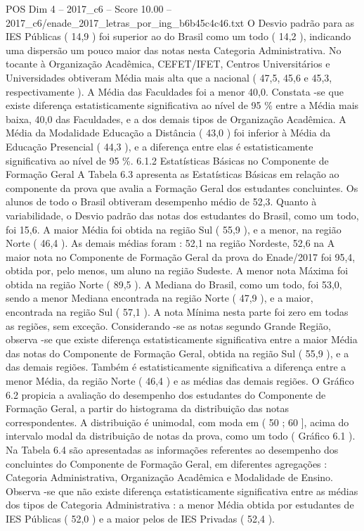 \begin{textsample}{POS Dim 4 – 2017\_c6 – Score 10.00 – 2017\_c6/enade\_2017\_letras\_por\_ing\_b6b45c4c46.txt}
O Desvio padrão para as IES Públicas ( 14,9 ) foi superior ao do Brasil como um todo ( 14,2 ), indicando uma dispersão um pouco maior das notas nesta Categoria Administrativa.
No tocante à Organização Acadêmica, CEFET/IFET, Centros Universitários e Universidades obtiveram Média mais alta que a nacional ( 47,5, 45,6 e 45,3, respectivamente ).
A Média das Faculdades foi a menor 40,0.
Constata -se que existe diferença estatisticamente significativa ao nível de 95 \% entre a Média mais baixa, 40,0 das Faculdades, e a dos demais tipos de Organização Acadêmica.
A Média da Modalidade Educação a Distância ( 43,0 ) foi inferior à Média da Educação Presencial ( 44,3 ), e a diferença entre elas é estatisticamente significativa ao nível de 95 \%. 6.1.2 Estatísticas Básicas no Componente de Formação Geral A Tabela 6.3 apresenta as Estatísticas Básicas em relação ao componente da prova que avalia a Formação Geral dos estudantes concluintes.
Os alunos de todo o Brasil obtiveram desempenho médio de 52,3.
Quanto à variabilidade, o Desvio padrão das notas dos estudantes do Brasil, como um todo, foi 15,6.
A maior Média foi obtida na região Sul ( 55,9 ), e a menor, na região Norte ( 46,4 ).
As demais médias foram : 52,1 na região Nordeste, 52,6 na A maior nota no Componente de Formação Geral da prova do Enade/2017 foi 95,4, obtida por, pelo menos, um aluno na região Sudeste.
A menor nota Máxima foi obtida na região Norte ( 89,5 ).
A Mediana do Brasil, como um todo, foi 53,0, sendo a menor Mediana encontrada na região Norte ( 47,9 ), e a maior, encontrada na região Sul ( 57,1 ).
A nota Mínima nesta parte foi zero em todas as regiões, sem exceção.
Considerando -se as notas segundo Grande Região, observa -se que existe diferença estatisticamente significativa entre a maior Média das notas do Componente de Formação Geral, obtida na região Sul ( 55,9 ), e a das demais regiões.
Também é estatisticamente significativa a diferença entre a menor Média, da região Norte ( 46,4 ) e as médias das demais regiões.
O Gráfico 6.2 propicia a avaliação do desempenho dos estudantes do Componente de Formação Geral, a partir do histograma da distribuição das notas correspondentes.
A distribuição é unimodal, com moda em ( 50 ; 60 ], acima do intervalo modal da distribuição de notas da prova, como um todo ( Gráfico 6.1 ).
Na Tabela 6.4 são apresentadas as informações referentes ao desempenho dos concluintes do Componente de Formação Geral, em diferentes agregações : Categoria Administrativa, Organização Acadêmica e Modalidade de Ensino.
Observa -se que não existe diferença estatisticamente significativa entre as médias dos tipos de Categoria Administrativa : a menor Média obtida por estudantes de IES Públicas ( 52,0 ) e a maior pelos de IES Privadas ( 52,4 ).

\end{textsample}

